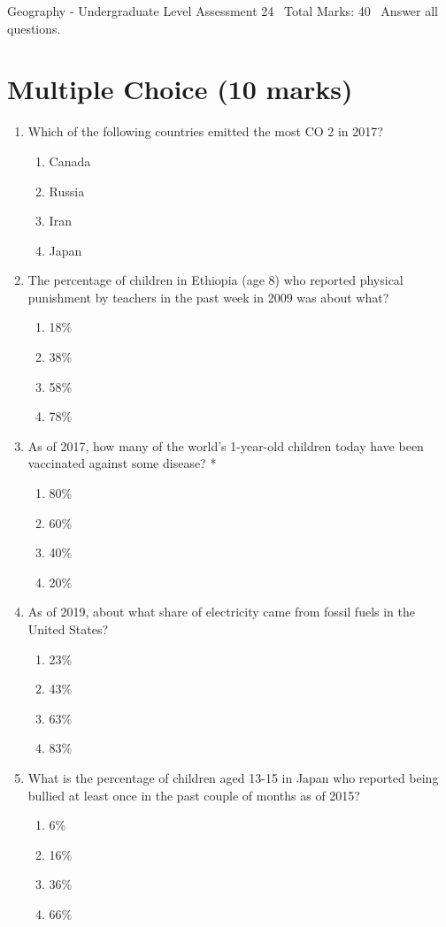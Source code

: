 \documentclass[12pt]{article}
\begin{document}
\begin{center}
Geography - Undergraduate Level Assessment 24 \
Total Marks: 40 \
Answer all questions.
\end{center}

\section*{Multiple Choice (10 marks)}
\begin{enumerate}[label=\arabic*.]
\item Which of the following countries emitted the most CO 2 in 2017?
\begin{enumerate}[label=(\alph*)]
    \item Canada
    \item Russia
    \item Iran
    \item Japan
\end{enumerate}
\item The percentage of children in Ethiopia (age 8) who reported physical punishment by teachers in the past week in 2009 was about what?
\begin{enumerate}[label=(\alph*)]
    \item 18\%
    \item 38\%
    \item 58\%
    \item 78\%
\end{enumerate}
\item As of 2017, how many of the world's 1-year-old children today have been vaccinated against some disease? *
\begin{enumerate}[label=(\alph*)]
    \item 80\%
    \item 60\%
    \item 40\%
    \item 20\%
\end{enumerate}
\item As of 2019, about what share of electricity came from fossil fuels in the United States?
\begin{enumerate}[label=(\alph*)]
    \item 23\%
    \item 43\%
    \item 63\%
    \item 83\%
\end{enumerate}
\item What is the percentage of children aged 13-15 in Japan who reported being bullied at least once in the past couple of months as of 2015?
\begin{enumerate}[label=(\alph*)]
    \item 6\%
    \item 16\%
    \item 36\%
    \item 66\%
\end{enumerate}
\end{enumerate}
\end{document}
